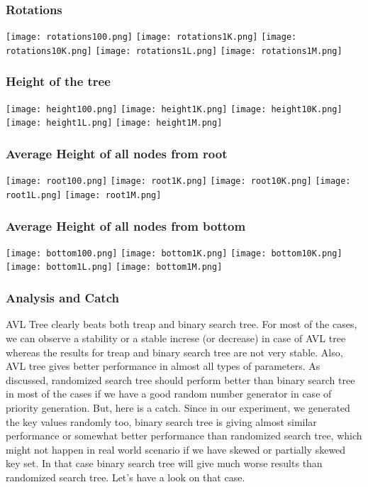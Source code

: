 \documentclass{article}
\begin{document}
\subsubsection{Rotations}
\begin{center}
\texttt{[image: rotations100.png]}
\texttt{[image: rotations1K.png]}
\texttt{[image: rotations10K.png]}
\texttt{[image: rotations1L.png]}
\texttt{[image: rotations1M.png]}
\end{center}
\subsubsection{Height of the tree}
\begin{center}
\texttt{[image: height100.png]}
\texttt{[image: height1K.png]}
\texttt{[image: height10K.png]}
\texttt{[image: height1L.png]}
\texttt{[image: height1M.png]}
\end{center}
\subsubsection{Average Height of all nodes from root}
\begin{center}
\texttt{[image: root100.png]}
\texttt{[image: root1K.png]}
\texttt{[image: root10K.png]}
\texttt{[image: root1L.png]}
\texttt{[image: root1M.png]}
\end{center}
\subsubsection{Average Height of all nodes from bottom}
\begin{center}
\texttt{[image: bottom100.png]}
\texttt{[image: bottom1K.png]}
\texttt{[image: bottom10K.png]}
\texttt{[image: bottom1L.png]}
\texttt{[image: bottom1M.png]}
\end{center}
\subsubsection{Analysis and Catch}
AVL Tree clearly beats both treap and binary search tree. For most of the cases, we can observe a stability or a stable increse (or decrease) in case of AVL tree whereas the results for treap and binary search tree are not very stable. Also, AVL tree gives better performance in almost all types of parameters. As discussed, randomized search tree should perform better than binary search tree in most of the cases if we have a good random number generator in case of priority generation.\newline
But, here is a catch. Since in our experiment, we generated the key values randomly too, binary search tree is giving almost similar performance or somewhat better performance than randomized search tree, which might not happen in real world scenario if we have skewed or partially skewed key set. In that case binary search tree will give much worse results than randomized search tree. Let's have a look on that case.
\end{document}
